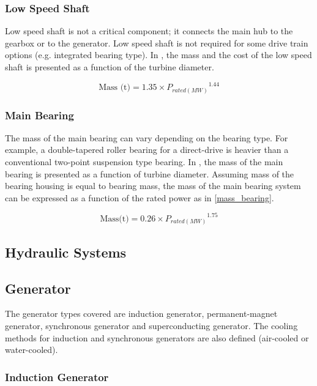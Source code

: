 \documentclass{article}\usepackage{graphicx, color}
\begin{document}
\subsubsection{Low Speed Shaft}
Low speed shaft is not a critical component; it connects the main hub to the gearbox or to the generator. Low speed shaft is not required for some drive train options (e.g. integrated bearing type). In \cite{Fingersh2006}, the mass and the cost of the low speed shaft is presented as a function of the turbine diameter.

\begin{equation}
		\text{Mass (t)} = 1.35 \times {P_{rated(MW)}}^{1.44}
\end{equation}

\subsubsection{Main Bearing}

The mass of the main bearing can vary depending on the bearing type. For example, a double-tapered roller bearing for a direct-drive is heavier than a conventional two-point suspension type bearing. In  \cite{Fingersh2006}, the mass of the main bearing is presented as a function of turbine diameter. Assuming mass of the bearing housing is equal to bearing mass, the mass of the main bearing system can be expressed as a function of the rated power as in \autoref{mass_bearing}.

\begin{equation}
	\text{Mass(t)} = 0.26 \times {P_{rated(MW)}}^{1.75}
  \label{mass_bearing}
\end{equation}

\subsection{Hydraulic Systems}

\subsection{Generator}

The generator types covered are induction generator, permanent-magnet generator, synchronous generator and superconducting generator. The cooling methods for induction and synchronous generators are also defined (air-cooled or water-cooled). 

\subsubsection{Induction Generator}
\end{document}

